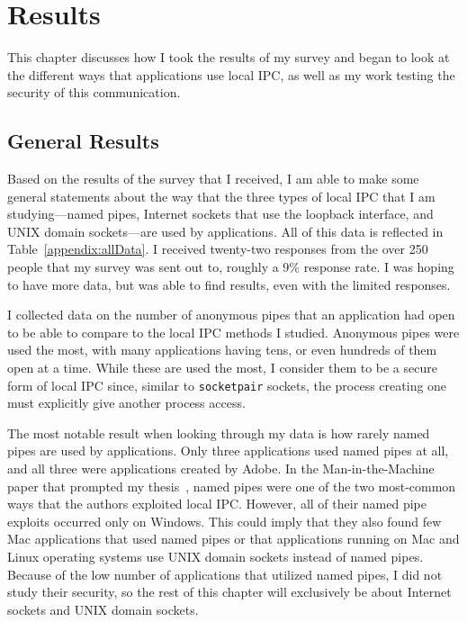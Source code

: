 \chapter{Results}
\label{sec:results}
This chapter discusses how I took the results of my survey and began to look at the different ways that applications use local IPC, as well as my work testing the security of this communication.

\section{General Results}
\label{sec:generalResults}
Based on the results of the survey that I received, I am able to make some general statements about the way that the three types of local IPC that I am studying---named pipes, Internet sockets that use the loopback interface, and UNIX domain sockets---are used by applications.  All of this data is reflected in Table~\ref{appendix:allData}.  I received twenty-two responses from the over 250 people that my survey was sent out to, roughly a 9\% response rate.  I was hoping to have more data, but was able to find results, even with the limited responses.

I collected data on the number of anonymous pipes that an application had open to be able to compare to the local IPC methods I studied.  Anonymous pipes were used the most, with many applications having tens, or even hundreds of them open at a time.  While these are used the most, I consider them to be a secure form of local IPC since, similar to \texttt{socketpair} sockets, the process creating one must explicitly give another process access.

The most notable result when looking through my data is how rarely named pipes are used by applications.  Only three applications used named pipes at all, and all three were applications created by Adobe.  In the Man-in-the-Machine paper that prompted my thesis~\cite{MitMa}, named pipes were one of the two most-common ways that the authors exploited local IPC.  However, all of their named pipe exploits occurred only on Windows.  This could imply that they also found few Mac applications that used named pipes or that applications running on Mac and Linux operating systems use UNIX domain sockets instead of named pipes.  Because of the low number of applications that utilized named pipes, I did not study their security, so the rest of this chapter will exclusively be about Internet sockets and UNIX domain sockets.

